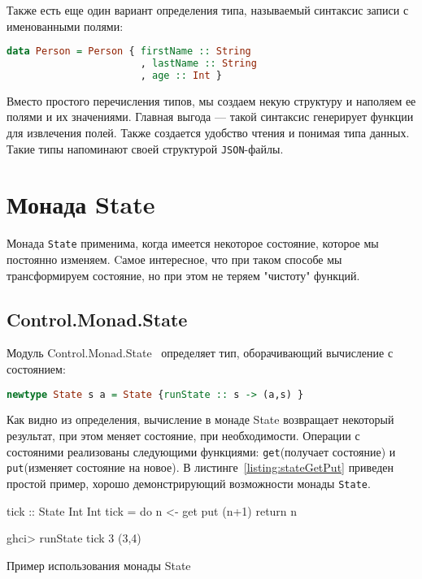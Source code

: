 Также есть еще один вариант определения типа, называемый синтаксис записи с именованными полями:

\begin{lstlisting}[language=Haskell]
data Person = Person { firstName :: String
                       , lastName :: String
                       , age :: Int }
\end{lstlisting}

Вместо простого перечисления типов, мы создаем некую структуру и наполяем ее полями и их значениями. Главная выгода –-- такой синтаксис генерирует функции для извлечения полей. Также создается удобство чтения и понимая типа данных. Такие типы напоминают своей структурой \lstinline{JSON}-файлы. 

\section{Монада State}

Монада \lstinline{State} применима, когда имеется некоторое состояние, которое мы постоянно изменяем. Cамое интересное, что при таком способе мы трансформируем состояние, но при этом не теряем "чистоту" функций. 

\subsection{Control.Monad.State}

Модуль Control.Monad.State~\cite{stateControl} определяет тип, оборачивающий вычисление с состоянием:

\begin{lstlisting}[language=Haskell]
newtype State s a = State {runState :: s -> (a,s) }
\end{lstlisting} 

Как видно из определения, вычисление в монаде State возвращает некоторый результат, при этом меняет состояние, при необходимости. Операции с состояними реализованы следующими функциями: \lstinline{get}(получает состояние) и \lstinline{put}(изменяет состояние на новое). В листинге~\ref{listing:stateGetPut} приведен простой пример, хорошо демонстрирующий возможности монады \lstinline{State}.

\begin{ListingEnv}[H]
\begin{Verb}
tick :: State Int Int
tick = do n <- get
	  put (n+1)
          return n

ghci> runState tick 3
(3,4)
\end{Verb}
\caption{Пример использования монады State}
\label{listing:stateGetPut}
\end{ListingEnv}

